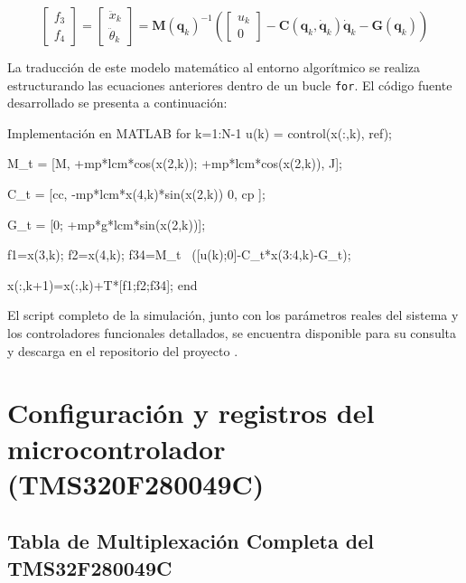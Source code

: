 \documentclass[11pt,fleqn]{book} %
\begin{document}
\begin{equation}
	\begin{bmatrix} f_3 \\ f_4 \end{bmatrix} = \begin{bmatrix} \ddot{x}_k \\ \ddot{\theta}_k \end{bmatrix} = \mathbf{M}(\mathbf{q}_k)^{-1} \left( \begin{bmatrix} u_k \\ 0 \end{bmatrix} - \mathbf{C}(\mathbf{q}_k, \dot{\mathbf{q}}_k)\dot{\mathbf{q}}_k - \mathbf{G}(\mathbf{q}_k) \right)
\end{equation}

La traducción de este modelo matemático al entorno algorítmico se realiza estructurando las ecuaciones anteriores dentro de un bucle \texttt{for}. El código fuente desarrollado se presenta a continuación:

\begin{matlabbox} {Implementación en MATLAB}
for k=1:N-1
	u(k) = control(x(:,k), ref); 
	
	M_t = [M,          +mp*lcm*cos(x(2,k));
	       +mp*lcm*cos(x(2,k)),      J];
	
	C_t = [cc,   -mp*lcm*x(4,k)*sin(x(2,k))
	        0,          cp        ];
	
	G_t = [0; +mp*g*lcm*sin(x(2,k))];
	
	f1=x(3,k);
	f2=x(4,k);
	f34=M_t \ ([u(k);0]-C_t*x(3:4,k)-G_t);
	
	x(:,k+1)=x(:,k)+T*[f1;f2;f34];
end
\end{matlabbox}

\vspace{0.3cm}
\noindent El script completo de la simulación, junto con los parámetros reales del sistema y los controladores funcionales detallados, se encuentra disponible para su consulta y descarga en el repositorio del proyecto \cite{Porcar2026TFG}.
\newpage

\section{Configuración y registros del microcontrolador (TMS320F280049C)}
\subsection{Tabla de Multiplexación Completa del TMS32F280049C} \label{ap:tabla_mux}
\end{document}
